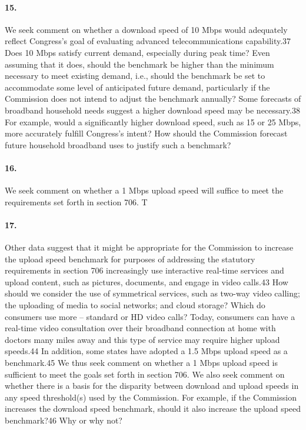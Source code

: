 \paragraph{15. }
We seek comment on whether a download speed of 10 Mbps would adequately reflect
Congress’s goal of evaluating advanced telecommunications capability.37
Does 10 Mbps satisfy current
demand, especially during peak time? Even assuming that it does, should the benchmark be higher than the minimum necessary to meet existing demand, i.e., should the benchmark be set to accommodate some level of anticipated future demand, particularly if the Commission does not intend to adjust the benchmark annually? Some forecasts of broadband household needs suggest a higher download speed may be necessary.38
For example, would a significantly higher download speed, such as 15 or 25 Mbps,
more accurately fulfill Congress’s intent? How should the Commission forecast future household broadband uses to justify such a benchmark?

\paragraph{16. }
We seek comment on whether a 1 Mbps upload speed will suffice to meet the
requirements set forth in section 706. T

\paragraph{17. }
Other data suggest that it might be appropriate for the Commission to increase the upload speed benchmark for purposes of addressing the statutory requirements in section 706
increasingly use interactive real-time services and upload content, such as pictures, documents, and engage in video calls.43
How should we consider the use of symmetrical services, such as two-way video
calling; the uploading of media to social networks; and cloud storage? Which do consumers use more – standard or HD video calls? Today, consumers can have a real-time video consultation over their broadband connection at home with doctors many miles away and this type of service may require higher upload speeds.44
In addition, some states have adopted a 1.5 Mbps upload speed as a benchmark.45 We
thus seek comment on whether a 1 Mbps upload speed is sufficient to meet the goals set forth in section 706. We also seek comment on whether there is a basis for the disparity between download and upload speeds in any speed threshold(s) used by the Commission. For example, if the Commission increases the download speed benchmark, should it also increase the upload speed benchmark?46
Why or why not?

